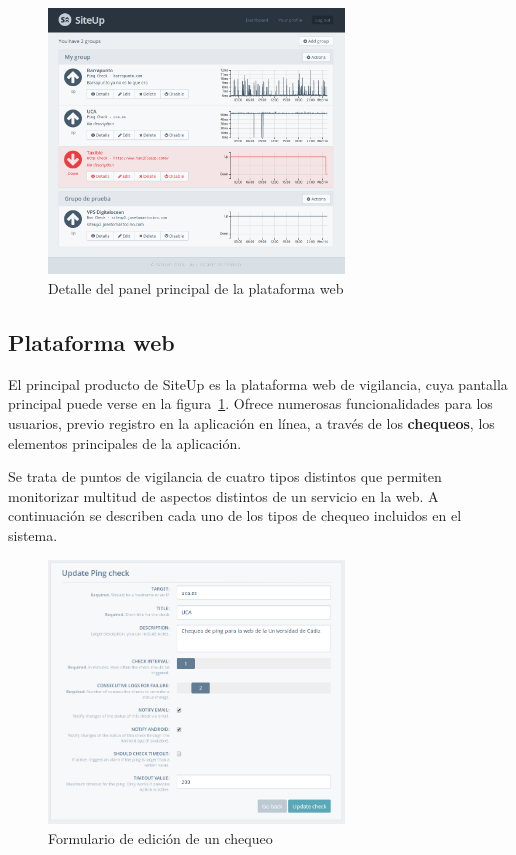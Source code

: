 \documentclass[a4paper,12pt]{article}
\begin{document}
\begin{figure}[hbt]
  \centering
  \includegraphics[width=0.7\textwidth]{detalle_dashboard}
  \caption{Detalle del panel principal de la plataforma web}
  \label{fig:detalle_dashboard}
\end{figure}

\subsection{Plataforma web}

El principal producto de SiteUp es la plataforma web de vigilancia, cuya
pantalla principal puede verse en la figura~\ref{fig:detalle_dashboard}. Ofrece
numerosas funcionalidades para los usuarios, previo registro en la aplicación en
línea, a través de los \textbf{chequeos}, los elementos principales de la
aplicación.

Se trata de puntos de vigilancia de cuatro tipos distintos que permiten
monitorizar multitud de aspectos distintos de un servicio en la web. A
continuación se describen cada uno de los tipos de chequeo incluidos en el
sistema.

\begin{figure}[t]
  \centering
  \includegraphics[width=0.7\textwidth]{detalle_formulario_chequeo}
  \caption{Formulario de edición de un chequeo}
  \label{fig:formulario_detalle_chequeo}
\end{figure}
\end{document}
